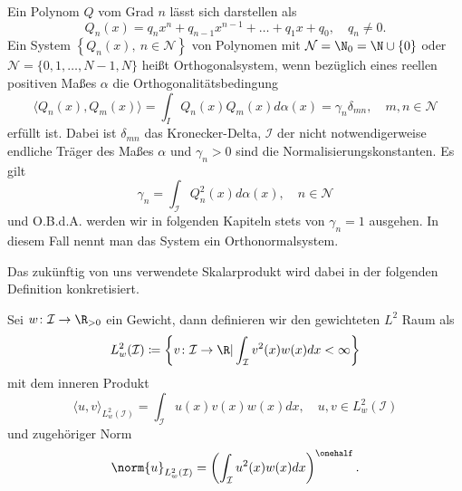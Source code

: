 \begin{mathdef}
Ein Polynom $Q$ vom Grad $n$ lässt sich darstellen als
\[Q_n(x)=q_nx^n+q_{n-1}x^{n-1}+\dots+q_1x+q_0,\quad q_n\ne 0.\]
Ein System $\left\lbrace Q_n(x),\: n\in\mathcal{N}\right\rbrace$ von Polynomen mit $\mathcal{N}=\N_0=\N\cup\lbrace 0\rbrace$ oder $\mathcal{N}=\lbrace 0,1,\dots,N-1,N\rbrace$ heißt Orthogonalsystem, wenn bezüglich eines reellen positiven Maßes $\alpha$ die Orthogonalitätsbedingung
 \[\langle Q_n(x),Q_m(x)\rangle =\int_I Q_n(x)Q_m(x)d\alpha(x)=\gamma_n\delta_{mn},\quad m,n\in\mathcal{N}\]
 erfüllt ist. Dabei ist $\delta_{mn}$ das Kronecker-Delta, $\mathcal{I}$ der nicht notwendigerweise endliche Träger des Maßes $\alpha$ und $\gamma_n>0$ sind die Normalisierungskonstanten. Es gilt 
 \[\gamma_n=\int_\mathcal{I} Q_n^2(x)d\alpha(x),\quad n\in\mathcal{N}\] und O.B.d.A. werden wir in folgenden Kapiteln stets von $\gamma_n=1$ ausgehen. In diesem Fall nennt man das System ein Orthonormalsystem.
\end{mathdef}
Das zukünftig von uns verwendete Skalarprodukt wird dabei in der folgenden Definition konkretisiert.
\begin{mathdef}
Sei $w\colon \mathcal{I}\to\R_{>0}$ ein Gewicht, dann definieren wir den gewichteten $L^2$ Raum als
\begin{equation*}
L_w^2(\mathcal{I})\coloneqq \left\lbrace v\colon \mathcal{I}\to\R | \int_\mathcal{I}v^2(x)w(x)dx<\infty\right\rbrace
\end{equation*}
mit dem inneren Produkt 
\[\langle u,v\rangle_{L_w^2(\mathcal{I})}=\int_\mathcal{I} u(x)v(x)w(x)dx,\quad u,v\in L_w^2(\mathcal{I})\]
und zugehöriger Norm
\[\norm{u}_{L_w^2(\mathcal{I})}=\left(\int_\mathcal{I} u^2(x)w(x)dx\right)^{\onehalf}.\]
\end{mathdef}

